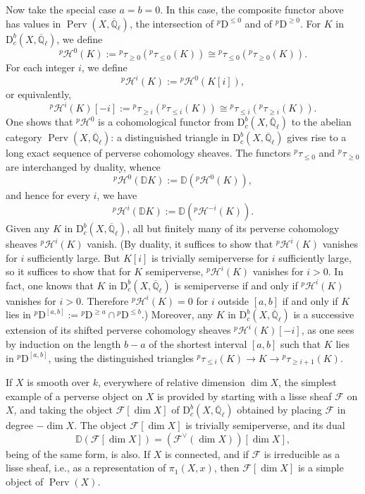Now take the special case \(a=b=0\). In this case, the composite functor above
has values in \(\operatorname{Perv}(X,\overline{\mathbb{Q}}_\ell)\), the
intersection of \({}^p\mathrm{D}^{\leq 0}\) and of
\({}^p\mathrm{D}^{\geq 0}\). For \(K\) in
\(\mathrm{D}^b_c(X,\overline{\mathbb{Q}}_\ell)\), we define
\[
  {}^p\mathcal{H}^0(K):=
  {}^p\tau_{\geq 0}({}^p\tau_{\leq 0}(K))
  \cong
  {}^p\tau_{\leq 0}({}^p\tau_{\geq 0}(K)).
\]
For each integer \(i\), we define
\[
  {}^p\mathcal{H}^i(K):={}^p\mathcal{H}^0(K[i]),
\]
or equivalently,
\[
  {}^p\mathcal{H}^i(K)[-i]:=
  {}^p\tau_{\geq i}({}^p\tau_{\leq i}(K))
  \cong
  {}^p\tau_{\leq i}({}^p\tau_{\geq i}(K)).
\]
One shows \cite[1.3.6]{BBD} that \({}^p\mathcal{H}^0\) is a cohomological
functor from \(\mathrm{D}^b_c(X,\overline{\mathbb{Q}}_\ell)\) to the abelian
category \(\operatorname{Perv}(X,\overline{\mathbb{Q}}_\ell)\): a distinguished
triangle in \(\mathrm{D}^b_c(X,\overline{\mathbb{Q}}_\ell)\) gives rise to a
long exact sequence of perverse cohomology sheaves. The functors
\({}^p\tau_{\leq 0}\) and \({}^p\tau_{\geq 0}\) are interchanged by duality,
whence
\[
  {}^p\mathcal{H}^0(\mathbb{D}K):=
  \mathbb{D}({}^p\mathcal{H}^0(K)),
\]
and hence for every \(i\), we have
\[
  {}^p\mathcal{H}^i(\mathbb{D}K):=
  \mathbb{D}({}^p\mathcal{H}^{-i}(K)).
\]
Given any \(K\) in \(\mathrm{D}^b_c(X,\overline{\mathbb{Q}}_\ell)\), all but
finitely many of its perverse cohomology sheaves
\({}^p\mathcal{H}^i(K)\) vanish. (By duality, it suffices to show that
\({}^p\mathcal{H}^i(K)\) vanishes for \(i\) sufficiently large. But \(K[i]\)
is trivially semiperverse for \(i\) sufficiently large, so it suffices to show
that for \(K\) semiperverse, \({}^p\mathcal{H}^i(K)\) vanishes for \(i>0\). In
fact, one knows \cite[1.3.7]{BBD} that \(K\) in
\(\mathrm{D}^b_c(X,\overline{\mathbb{Q}}_\ell)\) is semiperverse if and only
if \({}^p\mathcal{H}^i(K)\) vanishes for \(i>0\). Therefore
\({}^p\mathcal{H}^i(K)=0\) for \(i\) outside \([a,b]\) if and only if \(K\)
lies in
\({}^p\mathrm{D}^{[a,b]}:={}^p\mathrm{D}^{\geq a}\cap{}^p\mathrm{D}^{\leq b}\).)
Moreover, any \(K\) in \(\mathrm{D}^b_c(X,\overline{\mathbb{Q}}_\ell)\) is a
successive extension of its shifted perverse cohomology sheaves
\({}^p\mathcal{H}^i(K)[-i]\), as one sees by induction on the length \(b-a\) of
the shortest interval \([a,b]\) such that \(K\) lies in
\({}^p\mathrm{D}^{[a,b]}\), using the distinguished triangles
\({}^p\tau_{\leq i}(K)\to K\to{}^p\tau_{\geq i+1}(K)\).

If \(X\) is smooth over \(k\), everywhere of relative dimension \(\dim X\), the
simplest example of a perverse object on \(X\) is provided by starting with a
lisse sheaf \(\mathcal{F}\) on \(X\), and taking the object
\(\mathcal{F}[\dim X]\) of
\(\mathrm{D}^b_c(X,\overline{\mathbb{Q}}_\ell)\) obtained by placing
\(\mathcal{F}\) in degree \(-\dim X\). The object
\(\mathcal{F}[\dim X]\) is trivially semiperverse, and its dual
\[
  \mathbb{D}(\mathcal{F}[\dim X])
  =(\mathcal{F}^{\vee}(\dim X))[\dim X],
\]
being of the same form, is also. If \(X\) is connected, and if \(\mathcal{F}\)
is irreducible as a lisse sheaf, i.e., as a representation of
\(\pi_1(X,x)\), then \(\mathcal{F}[\dim X]\) is a simple object of
\(\operatorname{Perv}(X)\).

